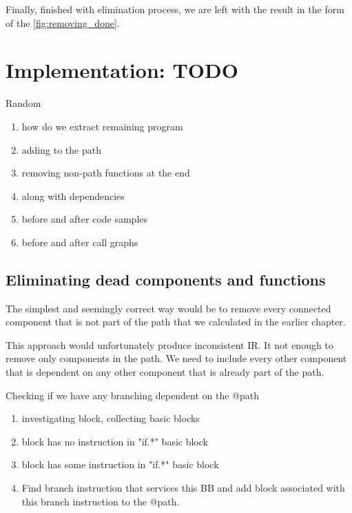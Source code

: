 \documentclass[12pt, twoside]{fithesis2}
\renewcommand{\_}{\leavevmode \kern0.07em\vbox{\hrule width0.4em}}
\newenvironment{myEnumerate}{
  \begin{enumerate}[
    leftmargin=2em,
    rightmargin=1em,
    itemsep=\parskip,
    parsep=0em,
    topsep=0em,
    partopsep=0em
]
}{
  \end{enumerate}
}
\begin{document}
Finally, finished with elimination process, we are left with the result in the
form of the \autoref{fig:removing_done}.


\chapter{Implementation: TODO}
\label{chap:implementation}

Random
\begin{myEnumerate}
\item how do we extract remaining program
\item adding to the path
\item removing non-path functions at the end
\item along with dependencies
\item before and after code samples
\item before and after call graphs
\end{myEnumerate}

\section{Eliminating dead components and functions}
The simplest and seemingly correct way would be to remove every connected
component that is not part of the path that we calculated in the earlier
chapter.

This approach would unfortunately produce inconsistent IR. It not enough to
remove only components in the path. We need to include every other component
that is dependent on any other component that is already part of the path.



Checking if we have any branching dependent on the @path

\begin{myEnumerate}
\item investigating block, collecting basic blocks
\item block has no instruction in "if.*" basic block
\item block has some instruction in "if.*" basic block
\item Find branch instruction that services this BB and add block associated with this branch instruction to the @path.
\end{myEnumerate}
\end{document}
